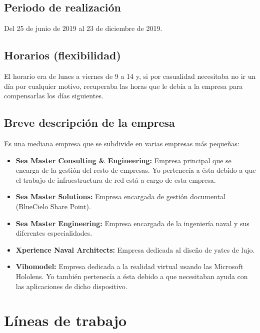 \documentclass[12pt,letterpaper]{article}
\begin{document}
\subsection{Periodo de realización}
Del 25 de junio de 2019 al 23 de diciembre de 2019.

\subsection{Horarios (flexibilidad)}
El horario era de lunes a viernes de 9 a 14 y, si por casualidad necesitaba no ir un día por cualquier motivo, recuperaba las horas que le debía a la empresa para compensarlas los días siguientes.

\subsection{Breve descripción de la empresa}
Es una mediana empresa que se subdivide en varias empresas más pequeñas:
\begin{itemize}
	\item \textbf{Sea Master Consulting \& Engineering:} Empresa principal que se encarga de la gestión del resto de empresas. Yo pertenecía a ésta debido a que el trabajo de infraestructura de red está a cargo de esta empresa.
	\item \textbf{Sea Master Solutions:} Empresa encargada de gestión documental (BlueCielo Share Point).
	\item \textbf{Sea Master Engineering:} Empresa encargada de la ingeniería naval y sus diferentes especialidades.
	\item \textbf{Xperience Naval Architects:} Empresa dedicada al diseño de yates de lujo.
	\item \textbf{Vihomodel:} Empresa dedicada a la realidad virtual usando las Microsoft Hololens. Yo también pertenecía a ésta debido a que necesitaban ayuda con las aplicaciones de dicho dispositivo.
\end{itemize}


\section{Líneas de trabajo}
\end{document}
